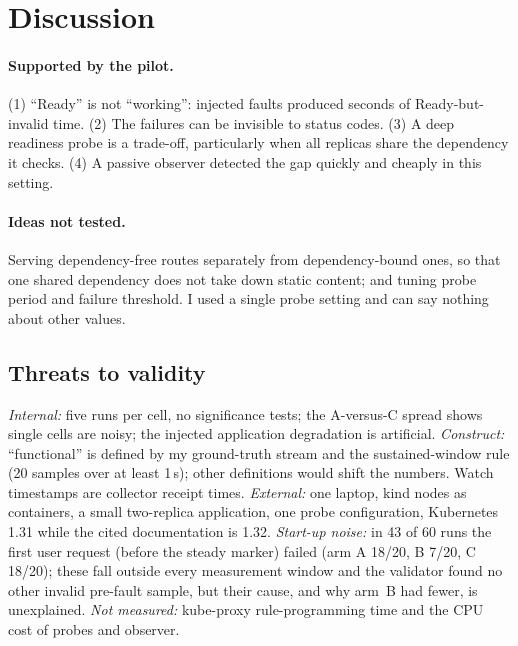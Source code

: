 \documentclass[11pt,a4paper]{article}
\begin{document}
\section{Discussion}
\paragraph{Supported by the pilot.} (1) ``Ready'' is not ``working'': injected faults produced seconds of Ready-but-invalid time. (2) The failures can be invisible to status codes. (3) A deep readiness probe is a trade-off, particularly when all replicas share the dependency it checks. (4) A passive observer detected the gap quickly and cheaply in this setting.

\paragraph{Ideas not tested.} Serving dependency-free routes separately from dependency-bound ones, so that one shared dependency does not take down static content; and tuning probe period and failure threshold. I used a single probe setting and can say nothing about other values.

\subsection*{Threats to validity}
\emph{Internal:} five runs per cell, no significance tests; the A-versus-C spread shows single cells are noisy; the injected application degradation is artificial. \emph{Construct:} ``functional'' is defined by my ground-truth stream and the sustained-window rule (20 samples over at least 1\,s); other definitions would shift the numbers. Watch timestamps are collector receipt times. \emph{External:} one laptop, kind nodes as containers, a small two-replica application, one probe configuration, Kubernetes 1.31 while the cited documentation is 1.32. \emph{Start-up noise:} in 43 of 60 runs the first user request (before the steady marker) failed (arm A 18/20, B 7/20, C 18/20); these fall outside every measurement window and the validator found no other invalid pre-fault sample, but their cause, and why arm~B had fewer, is unexplained. \emph{Not measured:} kube-proxy rule-programming time and the CPU cost of probes and observer.

\end{document}

